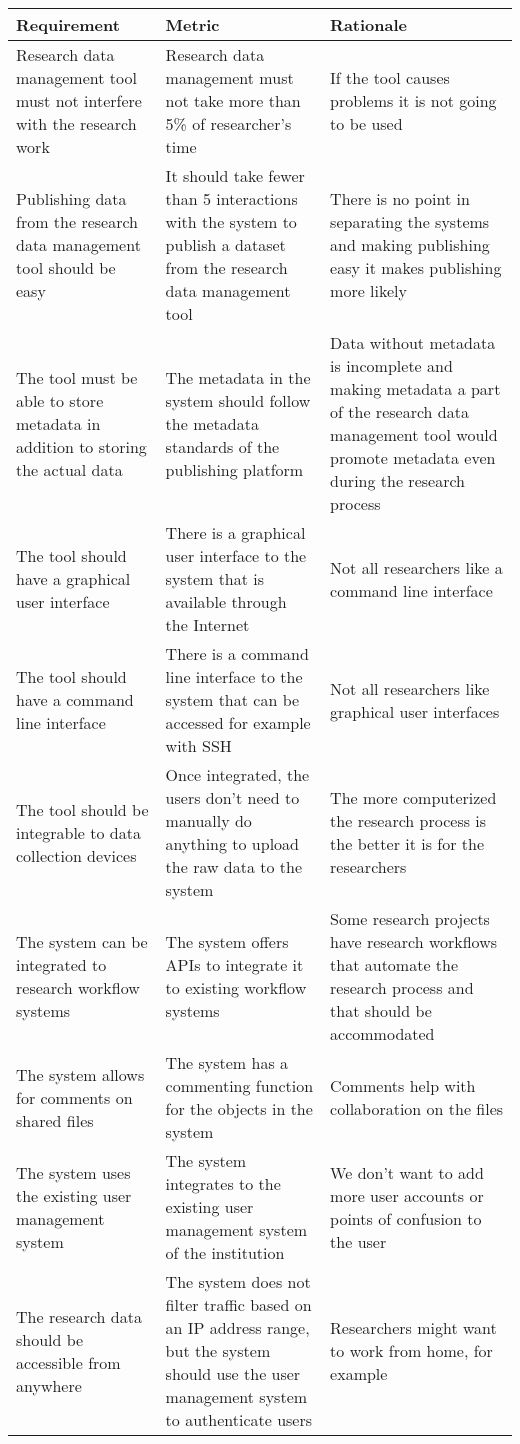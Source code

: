\tabcolsep=0.11cm
\begin{tabularx}{\textwidth}{| >{\raggedright}p{3cm} | >{\raggedright}p{3cm} | X |}
    \hline
    \textbf{Requirement} & \textbf{Metric}& \textbf{Rationale} \\
    \hline
    \rowcolor{Gray}
    Research data management tool must not interfere with the research work    &Research data management must not take more than 5\% of researcher’s time & If the tool causes problems it is not going to be used\\
    \hline
    Publishing data from the research data management tool should be easy&It should take fewer than 5 interactions with the system to publish a dataset from the research data management tool &There is no point in separating the systems and making publishing easy it makes publishing more likely\\
    \hline
    \rowcolor{Gray}
    The tool must be able to store metadata in addition to storing the actual data  &The metadata in the system should follow the metadata standards of the publishing platform&Data without metadata is incomplete and making metadata a part of the research data management tool would promote metadata even during the research process\\
    \hline
    The tool should have a graphical user interface  &There is a graphical user interface to the system that is available through the Internet & Not all researchers like a command line interface\\
    \hline
    \rowcolor{Gray}
    The tool should have a command line interface        &There is a command line interface to the system that can be accessed for example with SSH & Not all researchers like graphical user interfaces\\
    \hline
    The tool should be integrable to data collection devices  & Once integrated, the users don’t need to manually do anything to upload the raw data to the system & The more computerized the research process is the better it is for the researchers\\
    \hline
    \rowcolor{Gray}
    The system can be integrated to research workflow systems   &The system offers APIs to integrate it to existing workflow systems& Some research projects have research workflows that automate the research process and that should be accommodated\\
    \hline
    The system allows for comments on shared files &The system has a commenting function for the objects in the system & Comments help with collaboration on the files\\
    \hline
    \rowcolor{Gray}
    The system uses the existing user management system &The system integrates to the existing user management system of the institution &We don’t want to add more user accounts or points of confusion to the user\\
    \hline
    The research data should be accessible from anywhere  &The system does not filter traffic based on an IP address range, but the system should use the user management system to authenticate users  & Researchers might want to work from home, for example\\
    \hline
\end{tabularx}

